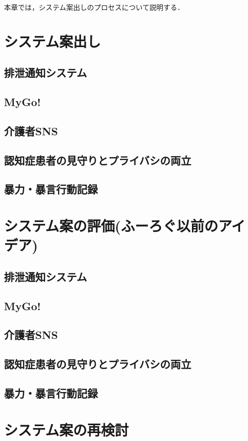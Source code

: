 \documentclass[../report]{subfiles}
\begin{document}
本章では，システム案出しのプロセスについて説明する．


\section{システム案出し} \label{sec:4_anndashi}
\subsection{排泄通知システム}

\subsection{MyGo!}

\subsection{介護者SNS}

\subsection{認知症患者の見守りとプライバシの両立}

\subsection{暴力・暴言行動記録}


\section{システム案の評価(ふーろぐ以前のアイデア)} \label{sec:4_hyouka_before}
\subsection{排泄通知システム}

\subsection{MyGo!}

\subsection{介護者SNS}

\subsection{認知症患者の見守りとプライバシの両立}

\subsection{暴力・暴言行動記録}


\section{システム案の再検討}
\end{document}
